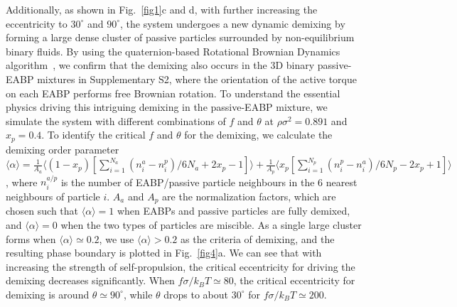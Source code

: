 \documentclass[prl, twocolumn, showpacs, preprintnumbers,amsmath,amssymb]{revtex4-1}
\begin{document}
Additionally, as shown in Fig.~\ref{fig1}c and d, with further increasing the eccentricity to $30^{\circ}$ and $90^{\circ}$, the system undergoes a new dynamic demixing by forming a large dense cluster of passive particles surrounded by non-equilibrium binary fluids. By using the quaternion-based Rotational Brownian Dynamics algorithm~\cite{ilie2015e}, we confirm that the demixing also occurs in the 3D binary passive-EABP mixtures in Supplementary S2, where the orientation of the active torque on each EABP performs free Brownian rotation. To understand the essential physics driving this intriguing demixing in the passive-EABP mixture, we simulate the system with different combinations of $f$ and $\theta$ at $\rho \sigma^2 = 0.891$ and $x_p = 0.4$. To identify the critical $f$ and $\theta$ for the demixing, we calculate the demixing order parameter $\langle \alpha \rangle = \frac{1}{A_a} \langle (1-x_p)[ \sum_{i=1}^{N_a}{(n_{i}^a - n_{i}^p)/6N_a + 2x_p - 1}]\rangle + \frac{1}{A_p}\langle x_p [ \sum_{i=1}^{N_p}{(n_{i}^p - n_{i}^a)/6N_p - 2x_p + 1}] \rangle$, where $n_{i}^{a/p}$ is the number of EABP/passive particle neighbours in the 6 nearest neighbours of particle $i$. $A_a$ and $A_p$ are the normalization factors, which are chosen such that $\langle \alpha \rangle = 1$ when EABPs and passive particles are fully demixed, and $\langle \alpha \rangle = 0$ when the two types of particles are miscible. As a single large cluster forms when $\langle \alpha \rangle \simeq 0.2$, we use $\langle \alpha \rangle > 0.2$ as the criteria of demixing, and the resulting phase boundary is plotted in Fig.~\ref{fig4}a. We can see that with increasing the strength of self-propulsion, the critical eccentricity for driving the demixing decreases significantly. When $f\sigma/k_BT \simeq 80$, the critical eccentricity for demixing is around $\theta \simeq 90^{\circ}$, while $\theta$ drops to about $30^{\circ}$ for $f\sigma/k_BT \simeq 200$.
\end{document}
